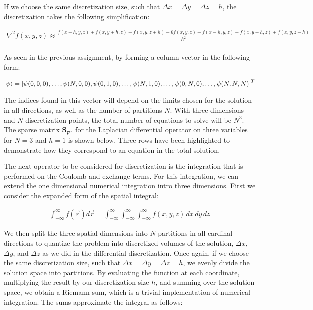 \documentclass[10pt, oneside, letterpaper]{article}
\begin{document}
If we choose the same discretization size, such that $\Delta x = \Delta y = \Delta z = h$, the discretization takes the following simplification:

\begin{align*}
  \nabla^2f(x, y, z) \approx \frac{f(x+h,y,z) + f(x,y+h,z) + f(x,y,z+h) - 6f(x, y, z) + f(x-h,y,z) + f(x,y-h,z) + f(x,y,z-h)}{h^2}\\
\end{align*}

As seen in the previous assignment, by forming a column vector in the following form:

\begin{align*}
  \ket{\psi} = \left[\psi(0,0,0), \hdots ,\psi(N,0,0),\psi(0,1,0),\hdots,\psi(N,1,0),\hdots,\psi(0,N,0),\hdots,\psi(N,N,N)\right]^T
\end{align*}

The indices found in this vector will depend on the limits chosen for the solution in all directions, as well as the number of partitions $N$. With three dimensions and $N$ discretization points, the total number of equations to solve will be $N^3$. The sparse matrix $\bm{S}_{\nabla^2}$ for the Laplacian differential operator on three variables for $N=3$ and $h=1$ is shown below. Three rows have been highlighted to demonstrate how they correspond to an equation in the total solution.

\newpage


The next operator to be considered for discretization is the integration that is performed on the Coulomb and exchange terms. For this integration, we can extend the one dimensional numerical integration intro three dimensions. First we consider the expanded form of the spatial integral:

\begin{align*}
  \int_{-\infty}^{\infty} f(\vec{r})d\vec{r} = \int_{-\infty}^{\infty}\int_{-\infty}^{\infty}\int_{-\infty}^{\infty}f(x,y,z)\,dx\,dy\,dz
\end{align*}

We then split the three spatial dimensions into $N$ partitions in all cardinal directions to quantize the problem into discretized volumes of the solution, $\Delta x$, $\Delta y$, and $\Delta z$ as we did in the differential discretization. Once again, if we choose the same discretization size, such that $\Delta x = \Delta y = \Delta z = h$, we evenly divide the solution space into partitions. By evaluating the function at each coordinate, multiplying the result by our discretization size $h$, and summing over the solution space, we obtain a Riemann sum, which is a trivial implementation of numerical integration. The sums approximate the integral as follows:
\end{document}
